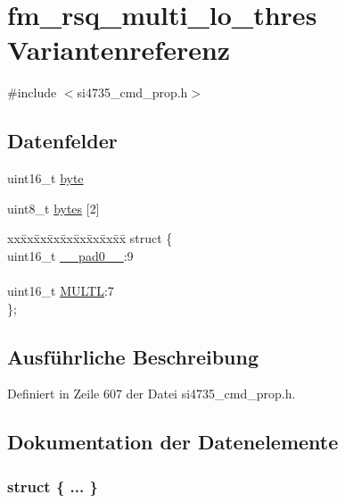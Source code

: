 \hypertarget{unionfm__rsq__multi__lo__thres}{}\section{fm\+\_\+rsq\+\_\+multi\+\_\+lo\+\_\+thres Variantenreferenz}
\label{unionfm__rsq__multi__lo__thres}


{\ttfamily \#include $<$si4735\+\_\+cmd\+\_\+prop.\+h$>$}

\subsection*{Datenfelder}
\begin{DoxyCompactItemize}
\item 
uint16\+\_\+t \hyperlink{unionfm__rsq__multi__lo__thres_ab0549c1b5ea980a02e7eab77e21fea49}{byte}
\item 
uint8\+\_\+t \hyperlink{unionfm__rsq__multi__lo__thres_a46e4c05d20a047ec169f60d3167e912e}{bytes} \mbox{[}2\mbox{]}
\item 
\begin{tabbing}
xx\=xx\=xx\=xx\=xx\=xx\=xx\=xx\=xx\=\kill
struct \{\\
\>uint16\_t \hyperlink{unionfm__rsq__multi__lo__thres_a77132c2c26a75f5b8751b235cda23828}{\_\_pad0\_\_}:9\\
\>\\
\>uint16\_t \hyperlink{unionfm__rsq__multi__lo__thres_aedafc0a3e30016fbf04b9fee188567c8}{MULTL}:7\\
\}; \\

\end{tabbing}\end{DoxyCompactItemize}


\subsection{Ausführliche Beschreibung}


Definiert in Zeile 607 der Datei si4735\+\_\+cmd\+\_\+prop.\+h.



\subsection{Dokumentation der Datenelemente}
\hypertarget{unionfm__rsq__multi__lo__thres_a6a4a7f0786d464d7880250dac4712ddf}{}\subsubsection[{"@69}]{\setlength{\rightskip}{0pt plus 5cm}struct \{ ... \} }\label{unionfm__rsq__multi__lo__thres_a6a4a7f0786d464d7880250dac4712ddf}
\hypertarget{unionfm__rsq__multi__lo__thres_a77132c2c26a75f5b8751b235cda23828}{}
